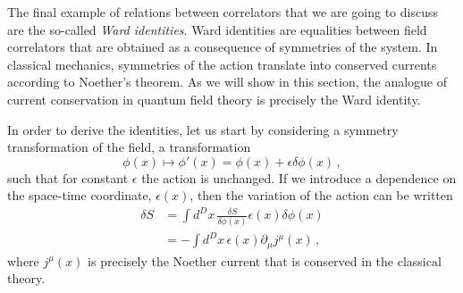 \documentclass[notes]{subfiles}
\begin{document}
The final example of relations between correlators that we are going
to discuss are the so-called \emph{Ward identities}. Ward identities
are equalities between field correlators that are obtained as a
consequence of symmetries of the system. In classical mechanics,
symmetries of the action translate into conserved currents according
to Noether's theorem. As we will show in this section, the analogue of
current conservation in quantum field theory is precisely the Ward
identity. 

In order to derive the identities, let us start by considering a
symmetry transformation of the field, \ie a transformation
\begin{equation}
  \label{eq:FieldTrans}
  \phi(x) \mapsto \phi'(x)=\phi(x) + \epsilon \delta\phi(x) \, ,
\end{equation}
such that for constant $\epsilon$ the action is unchanged. If we introduce
a dependence on the space-time coordinate, $\epsilon(x)$, then the
variation of the action can be written
\begin{align}
  \label{eq:SVar}
  \delta S &= \int d^Dx\, \frac{\delta S}{\delta\phi(x)} \epsilon(x)
             \delta\phi(x) \\
             &= -\int d^Dx\, \epsilon(x) \partial_\mu j^\mu(x)\, , 
\end{align}
where $j^\mu(x)$ is precisely the Noether current that is conserved in
the classical theory. 
\end{document}

